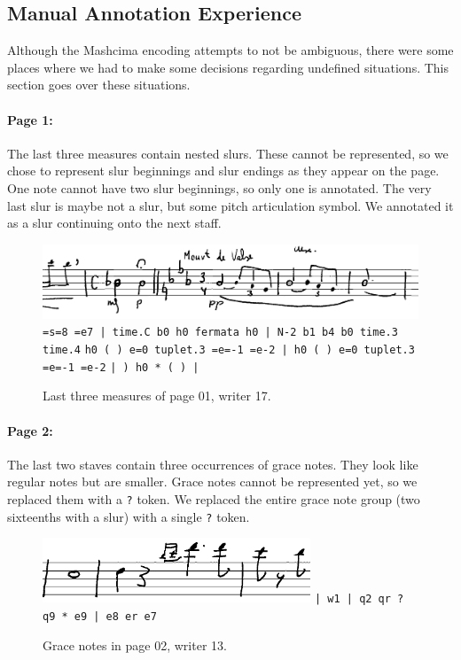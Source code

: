 \newpage


\subsection{Manual Annotation Experience}
\label{sec:ManualAnnotationExperience}

Although the Mashcima encoding attempts to not be ambiguous, there were some places where we had to make some decisions regarding undefined situations. This section goes over these situations.

\paragraph{Page 1:} The last three measures contain nested slurs. These cannot be represented, so we chose to represent slur beginnings and slur endings as they appear on the page. One note cannot have two slur beginnings, so only one is annotated. The very last slur is maybe not a slur, but some pitch articulation symbol. We annotated it as a slur continuing onto the next staff.

\begin{figure}[h]
    \centering
    \includegraphics[width=140mm]{../img/ae-01}
    \verb`=s=8 =e7 | time.C b0 h0 fermata h0 | N-2 b1 b4 b0 time.3 time.4`
    \verb`h0 ( ) e=0 tuplet.3 =e=-1 =e-2 | h0 ( ) e=0 tuplet.3 =e=-1 =e-2`
    \verb`| ) h0 * ( ) |`
    \caption{Last three measures of page 01, writer 17.}
    \label{fig6:AnnotationExperience01}
\end{figure}

\paragraph{Page 2:} The last two staves contain three occurrences of grace notes. They look like regular notes but are smaller. Grace notes cannot be represented yet, so we replaced them with a \verb`?` token. We replaced the entire grace note group (two sixteenths with a slur) with a single \verb`?` token.

\begin{figure}[h]
    \centering
    \includegraphics[width=80mm]{../img/ae-02}
    \verb`| w1 | q2 qr ? q9 * e9 | e8 er e7`
    \caption{Grace notes in page 02, writer 13.}
    \label{fig6:AnnotationExperience02}
\end{figure}

